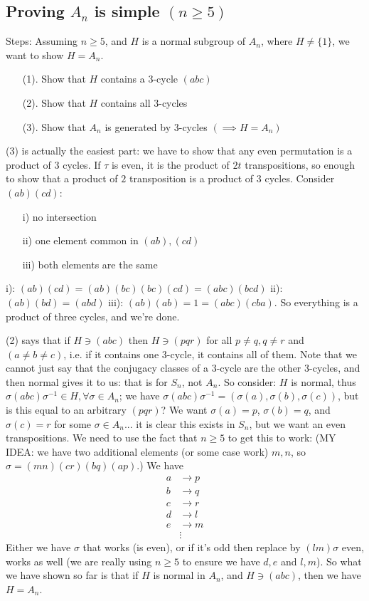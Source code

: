 \documentclass{article}
\theoremstyle{plain}
\theoremstyle{remark}
\begin{document}
\subsection{Proving $A_n$ is simple $(n \geq 5)$}
Steps:
Assuming $n \geq 5$, and $H$ is a normal subgroup of $A_n$,
where $H \neq \{1\}$, we want to show $H = A_n$.
\begin{enumerate}
	\item[(1).] Show that $H$ contains a $3$-cycle $(abc)$
	\item[(2).] Show that $H$ contains all $3$-cycles
	\item[(3).] Show that $A_n$ is generated by $3$-cycles $(\implies H = A_n)$
\end{enumerate}
(3) is actually the easiest part: we have to show that any even permutation
is a product of $3$ cycles.
If $\tau$ is even, it is the product of $2t$ transpositions,
so enough to show that a product of $2$ transposition is a product of $3$ cycles.
Consider $(ab)(cd)$:
\begin{enumerate}
	\item[i)] no intersection
	\item[ii)] one element common in $(ab),(cd)$
	\item[iii)] both elements are the same
\end{enumerate}
i): $(ab)(cd) = (ab)(bc)(bc)(cd) = (abc)(bcd)$
ii): $(ab)(bd) = (abd)$
iii): $(ab)(ab) = 1 = (abc)(cba)$.
So everything is a product of three cycles, and we're done.

(2) says that if $H \ni (abc)$ then $H \ni (pqr)$ for all $p\neq q, q \neq r$
and $(a \neq b \neq c)$,
i.e. if it contains one $3$-cycle, it contains all of them.
Note that we cannot just say that the conjugacy classes of a $3$-cycle
are the other $3$-cycles, and then normal gives it to us:
that is for $S_n$, not $A_n$.
So consider: $H$ is normal, thus $\sigma (abc) \sigma^{-1} \in H,
\forall \sigma \in A_n$;
we have $\sigma(abc)\sigma^{-1} = (\sigma(a),\sigma(b),\sigma(c))$,
but is this equal to an arbitrary $(pqr)$?
We want $\sigma(a) = p$, $\sigma(b) = q$, and $\sigma(c) = r$
for some $\sigma \in A_n$...
it is clear this exists in $S_n$, but we want an even transpositions.
We need to use the fact that $n \geq 5$ to get this to work:
(MY IDEA: we have two additional elements (or some case work) $m,n$,
so $\sigma = (mn)(cr)(bq)(ap)$.)
We have
\begin{align*}
	a &\to p\\
	b &\to q\\
	c &\to r\\
	d &\to l\\
	e &\to m\\
	  &\vdots
\end{align*}
Either we have $\sigma$ that works (is even),
or if it's odd then replace by $(lm)\sigma$ even, works as well
(we are really using $n \geq 5$ to ensure we have $d,e$ and $l,m$).
So what we have shown so far is that if $H$ is normal in $A_n$,
and $H \ni (abc)$, then we have $H = A_n$.
\end{document}
